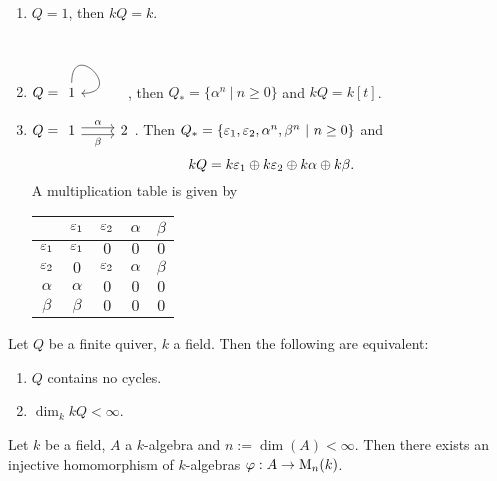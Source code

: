 \begin{bsp}\label{1:quiv}
	\begin{enumerate}
		\item $Q=1$, then $kQ=k$.
		\item $Q=\begin{tikzcd}1\arrow[out=90,in=0,loop]\end{tikzcd}$, then $Q_{\ast}=\{\alpha^n~|~n\geq 0\}$ and $kQ = k[t]$.
		\item $Q =\begin{tikzcd}1\ar[shift left]{r}{\alpha}\ar[shift right,swap]{r}{\beta}&2\end{tikzcd}$. Then
		$Q_{\ast} = \{\varepsilon_1,\varepsilon_2,\alpha^n,\beta^n~|~n\geq 0\}$ and
		\[
		kQ = k\varepsilon_1\oplus k\varepsilon_2\oplus k\alpha \oplus k\beta.
		\]
		A multiplication table is given by\\
		\begin{center}
			\begin{tabular}{|c|c|c|c|c|}
				\hline
				&$\varepsilon_1$&$\varepsilon_2$&$\alpha$&$\beta$\\ \hline
				$\varepsilon_1$&$\varepsilon_1$&$0$&$0$&$0$\\ \hline
				$\varepsilon_2$&$0$&$\varepsilon_2$&$\alpha$&$\beta$\\ \hline
				$\alpha$&$\alpha$&$0$&$0$&$0$\\ \hline
				$\beta$&$\beta$&$0$&$0$&$0$\\ \hline
			\end{tabular}
		\end{center}
	\end{enumerate}
\end{bsp}
\coms
\begin{lem}%
	Let $Q$ be a finite quiver, $k$ a field. Then the following are equivalent:
	\begin{enumerate}
		\item $Q$ contains no cycles.
		\item $\dim_k kQ<\infty$.
	\end{enumerate}
\end{lem}
\come
\begin{lem}
	Let $k$ be a field, $A$ a $k$-algebra and $n:=\dim(A)<\infty$. Then there exists an injective homomorphism of $k$-algebras $\varphi:A\to \operatorname{M}_n(k)$.
\end{lem}
